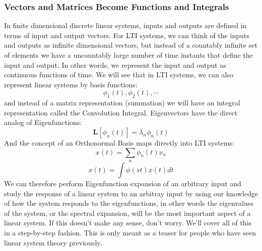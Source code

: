 \subsubsection{Vectors and Matrices Become Functions and Integrals}
 In finite dimensional discrete linear systems, inputs and outputs are defined in terms of input and output vectors.  For LTI systems, we can think of the inputs and outputs as infinite dimensional vectors, but instead of a countably infinite set of elements we have a uncountably large number of time instants that define the input and output.  In other words, we represent the input and output as continuous functions of time.   We will see that in LTI systems, we can also represent linear systems by basis functions:
    \begin{equation}
        \phi_1(t), \phi_2(t), \cdots
    \end{equation}
and instead of a matrix representation (summation) we will have an integral representation called the Convolution Integral.  Eigenvectors have the direct analog of Eigenfunctions:
    \begin{equation}
        \mathbf{L} [  \phi_n(t)  ] = \lambda_n  \phi_n(t)
    \end{equation}
And the concept of an Orthonormal Basis maps directly into LTI systems:
    \begin{equation}
        x(t) = \sum_n \phi_n(t) x_n
    \end{equation}
    \begin{equation}
        x(t) = \int \phi(s t) x(t) dt
    \end{equation}
We can therefore perform Eigenfunction expansion of an arbitrary input and study the response of a linear system to an arbitray input by using our knowledge of how the system responds to the eigenfunctions, in other words the eigenvalues of the system, or the spectral expansion, will be the most important aspect of a linear system.
If this doesn't make any sense, don't worry.  We'll cover all of this in a step-by-step fashion. This is only meant as a teaser for people who have seen linear system theory previously. 
